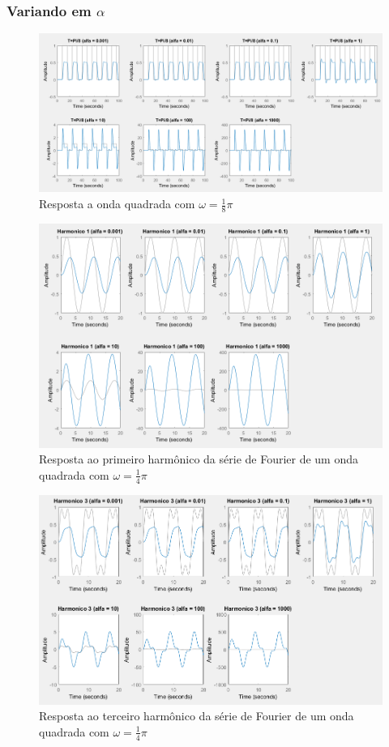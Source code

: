 \documentclass[a4paper, 12pt]{article}
\begin{document}
			\subsubsection{Variando em $\alpha$}
			\begin{figure}[!ht]
				\centering
				\includegraphics[scale=0.4]{img/3f_alfa.png}
				\caption{Resposta a onda quadrada com $\omega = \frac{1}{8}\pi$}	
			\end{figure}			
			\begin{figure}[!ht]
				\centering
				\includegraphics[scale=0.5]{img/3g_alfa.png}
				\caption{Resposta ao primeiro harmônico da série de Fourier de um onda quadrada com $\omega = \frac{1}{4}\pi$}	
			\end{figure}		
			\begin{figure}[!ht]
				\centering
				\includegraphics[scale=0.5]{img/3h_alfa.png}
				\caption{Resposta ao terceiro harmônico da série de Fourier de um onda quadrada com $\omega = \frac{1}{4}\pi$}	
			\end{figure}			
\end{document}

